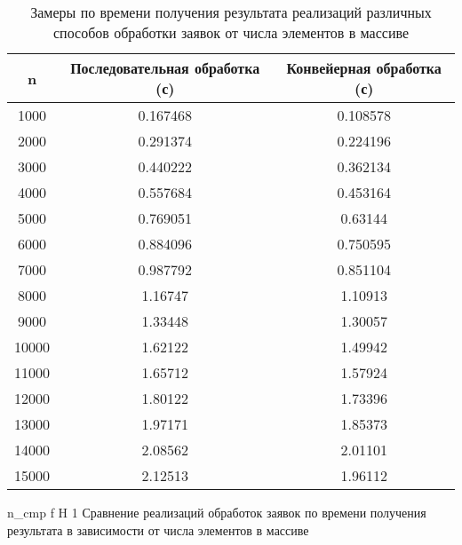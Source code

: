 \begin{table}[H]
	\centering
	\caption{Замеры по времени получения результата реализаций различных способов обработки заявок от числа элементов в массиве}
	\begin{tabular}{|c|c|c|}
	\hline
	n     & Последовательная обработка (с) & Конвейерная обработка (с) \\ \hline
	1000  & 0.167468                       & 0.108578                  \\ \hline
	2000  & 0.291374                       & 0.224196                  \\ \hline
	3000  & 0.440222                       & 0.362134                  \\ \hline
	4000  & 0.557684                       & 0.453164                  \\ \hline
	5000  & 0.769051                       & 0.63144                   \\ \hline
	6000  & 0.884096                       & 0.750595                  \\ \hline
	7000  & 0.987792                       & 0.851104                  \\ \hline
	8000  & 1.16747                        & 1.10913                   \\ \hline
	9000  & 1.33448                        & 1.30057                   \\ \hline
	10000 & 1.62122                        & 1.49942                   \\ \hline
	11000 & 1.65712                        & 1.57924                   \\ \hline
	12000 & 1.80122                        & 1.73396                   \\ \hline
	13000 & 1.97171                        & 1.85373                   \\ \hline
	14000 & 2.08562                        & 2.01101                   \\ \hline
	15000 & 2.12513                        & 1.96112                   \\ \hline
	\end{tabular}
	\label{t:timings_n}
\end{table}

{n_cmp} %
{f} %
{H} %
{1\textwidth} %
{Сравнение реализаций обработок заявок по времени получения результата в зависимости от числа элементов в массиве} %


